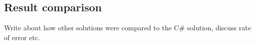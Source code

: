\subsection{Result comparison}\label{subsec:result_comparison}
Write about how other solutions were compared to the C\# solution, discuss rate of error etc.